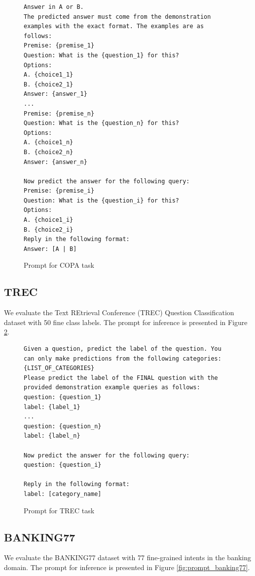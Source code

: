 \documentclass{llmxive}
\begin{document}
\begin{figure}[ht]
    \centering
    {\tiny
\begin{lstlisting}
Answer in A or B.
The predicted answer must come from the demonstration examples with the exact format. The examples are as follows:
Premise: {premise_1}
Question: What is the {question_1} for this?
Options:
A. {choice1_1}
B. {choice2_1}
Answer: {answer_1}
...
Premise: {premise_n}
Question: What is the {question_n} for this?
Options:
A. {choice1_n}
B. {choice2_n}
Answer: {answer_n}

Now predict the answer for the following query:
Premise: {premise_i}
Question: What is the {question_i} for this?
Options:
A. {choice1_i}
B. {choice2_i}
Reply in the following format:
Answer: [A | B]
\end{lstlisting}
}
    \caption{Prompt for COPA task}
    \label{fig:prompt_copa}
\end{figure}





\subsection{TREC}
We evaluate the Text REtrieval Conference (TREC) Question Classification dataset with 50 fine class labels. The prompt for inference is presented in Figure \ref{fig:prompt_trec}. %

\begin{figure}[ht]
    \centering
    {\tiny
\begin{lstlisting}
Given a question, predict the label of the question. You can only make predictions from the following categories: {LIST_OF_CATEGORIES}
Please predict the label of the FINAL question with the provided demonstration example queries as follows:
question: {question_1}
label: {label_1}
...
question: {question_n}
label: {label_n}

Now predict the answer for the following query:
question: {question_i}

Reply in the following format:
label: [category_name]
\end{lstlisting}
}
    \caption{Prompt for TREC task}
    \label{fig:prompt_trec}
\end{figure}



\subsection{BANKING77}
We evaluate the BANKING77 dataset with 77 fine-grained intents in the banking domain. The prompt for inference is presented in Figure \ref{fig:prompt_banking77}. %
\end{document}

